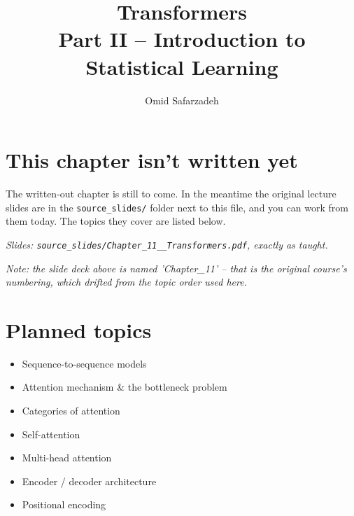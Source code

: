 \documentclass[11pt]{article}
\title{Transformers \\ \large Part II -- Introduction to Statistical Learning}
\author{Omid Safarzadeh}
\date{}
\begin{document}
\maketitle

\section*{This chapter isn't written yet}
The written-out chapter is still to come. In the meantime the original
lecture slides are in the \texttt{source\_slides/} folder next to this
file, and you can work from them today. The topics they cover are listed
below.

\textit{Slides: \texttt{source\_slides/Chapter\_11\_\_Transformers.pdf}, exactly as taught.}

\textit{Note: the slide deck above is named 'Chapter\_11' -- that is the original course's numbering, which drifted from the topic order used here.}

\section*{Planned topics}
\begin{itemize}
  \item Sequence-to-sequence models
  \item Attention mechanism \& the bottleneck problem
  \item Categories of attention
  \item Self-attention
  \item Multi-head attention
  \item Encoder / decoder architecture
  \item Positional encoding
\end{itemize}
\end{document}

